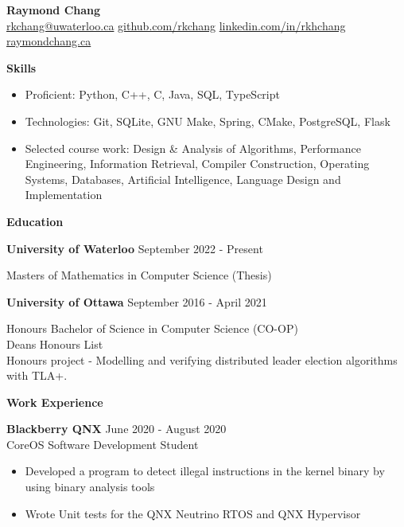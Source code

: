 \documentclass[10pt]{article}
\begin{document}
\begin{center}
    {\huge\textbf{Raymond Chang}} \\
     \href{mailto:rkchang@uwaterloo.ca}{rkchang@uwaterloo.ca}  \space\space
     \href{https://github.com/rkchang}{github.com/rkchang} \space\space
     \href{https://linkedin.com/in/rkhchang}{linkedin.com/in/rkhchang} \\
     \href{https://raymondchang.ca/}{raymondchang.ca} \\ \end{center}

{\Large\textbf{Skills}}\space \hrulefill
\begin{itemize}[noitemsep]
    \item Proficient: Python, C++, C, Java, SQL, TypeScript
    \item Technologies: Git, SQLite, GNU Make, Spring, CMake, PostgreSQL, Flask
    \item Selected course work:  Design \& Analysis of Algorithms, Performance Engineering, Information Retrieval, Compiler Construction, Operating Systems, Databases, Artificial Intelligence, Language Design and Implementation
\end{itemize}

\smallskip

{\Large\textbf{Education}}\space \hrulefill

\textbf{University of Waterloo} \hfill September 2022 - Present

Masters of Mathematics in Computer Science (Thesis)

\hfill

\textbf{University of Ottawa} \hfill September 2016 - April 2021

Honours Bachelor of Science in Computer Science (CO-OP) \\ Deans Honours List \\ Honours project - Modelling and verifying distributed leader election algorithms with TLA+.
\bigskip

{\Large\textbf{Work Experience}}\space \hrulefill

\textbf{Blackberry QNX} \hfill June 2020 - August 2020 \\
CoreOS Software Development Student
\begin{itemize}[noitemsep]
    \item Developed a program to detect illegal instructions in the kernel binary by using binary analysis tools
    \item Wrote Unit tests for the QNX Neutrino RTOS and QNX Hypervisor
\end{itemize}
\end{document}
